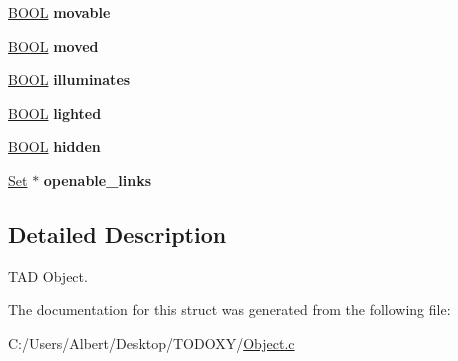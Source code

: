 \begin{DoxyCompactItemize}
\item 
\hypertarget{struct___object_ae013850f78da07c39e530f36bf98f2b9}{\hyperlink{_types_8h_a3e5b8192e7d9ffaf3542f1210aec18dd}{B\-O\-O\-L} {\bfseries movable}}\label{struct___object_ae013850f78da07c39e530f36bf98f2b9}

\item 
\hypertarget{struct___object_a584096c8e43f53884aa7216505cc0e89}{\hyperlink{_types_8h_a3e5b8192e7d9ffaf3542f1210aec18dd}{B\-O\-O\-L} {\bfseries moved}}\label{struct___object_a584096c8e43f53884aa7216505cc0e89}

\item 
\hypertarget{struct___object_a2b4ab5b0fe2674850d81f40923916d31}{\hyperlink{_types_8h_a3e5b8192e7d9ffaf3542f1210aec18dd}{B\-O\-O\-L} {\bfseries illuminates}}\label{struct___object_a2b4ab5b0fe2674850d81f40923916d31}

\item 
\hypertarget{struct___object_aadad4b023df75155e9bca722565bbdec}{\hyperlink{_types_8h_a3e5b8192e7d9ffaf3542f1210aec18dd}{B\-O\-O\-L} {\bfseries lighted}}\label{struct___object_aadad4b023df75155e9bca722565bbdec}

\item 
\hypertarget{struct___object_a44824966fc9f4d5f82c189b2e063ddc4}{\hyperlink{_types_8h_a3e5b8192e7d9ffaf3542f1210aec18dd}{B\-O\-O\-L} {\bfseries hidden}}\label{struct___object_a44824966fc9f4d5f82c189b2e063ddc4}

\item 
\hypertarget{struct___object_ac820f0ca6ffcedadf32c15bd0b535753}{\hyperlink{_set_8h_a6d3b7f7c92cbb4577ef3ef7ddbf93161}{Set} $\ast$ {\bfseries openable\-\_\-links}}\label{struct___object_ac820f0ca6ffcedadf32c15bd0b535753}

\end{DoxyCompactItemize}


\subsection{Detailed Description}
T\-A\-D Object. 


\begin{DoxyItemize}
\item 
\end{DoxyItemize}

The documentation for this struct was generated from the following file\-:\begin{DoxyCompactItemize}
\item 
C\-:/\-Users/\-Albert/\-Desktop/\-T\-O\-D\-O\-X\-Y/\hyperlink{_object_8c}{Object.\-c}\end{DoxyCompactItemize}
